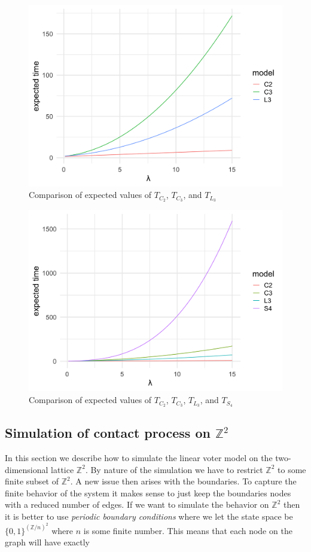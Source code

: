 \documentclass{article}
\theoremstyle{plain}
\theoremstyle{definition}
\theoremstyle{remark}
\numberwithin{equation}{section}
\newcommand{\Z}{\mathbb{Z}}
\begin{document}
\begin{figure}[H]
  \centering
    \includegraphics[width=.80\textwidth]{figures/ev_phase_comparison_3.png}
   \caption{Comparison of expected values of $T_{C_2}$, $T_{C_3}$, and $T_{L_3}$}
  \label{fig:ev_phase_comparison_3.png}
\end{figure}

\begin{figure}[H]
  \centering
    \includegraphics[width=.80\textwidth]{figures/ev_phase_comparison_4.png}
   \caption{Comparison of expected values of $T_{C_2}$, $T_{C_3}$, $T_{L_3}$, and $T_{S_4}$}
  \label{fig:ev_phase_comparison_4.png}
\end{figure}

\subsection{Simulation of contact process on \texorpdfstring{$\Z^2$}{Z2}}
In this section we describe how to simulate the linear voter model on the two-dimensional lattice $\Z^2$.
By nature of the simulation we have to restrict $\Z^2$ to some finite subset of $\Z^2$.
A new issue then arises with the boundaries.
To capture the finite behavior of the system it makes sense to just keep the boundaries nodes with a reduced number of edges.
If we want to simulate the behavior on $\Z^2$ then it is better to use \textit{periodic boundary conditions} where we let the state space be $\{0,1\}^{(\Z/n)^2}$ where $n$ is some finite number.
This means that each node on the graph will have exactly
\end{document}
